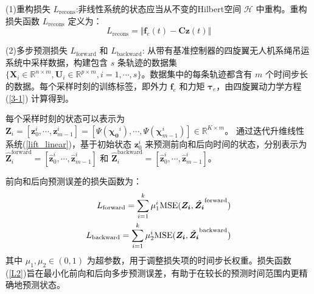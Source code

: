 \documentclass[lang=chs, degree=master, blindreview=true, winfonts=true]{yanputhesis}
\begin{document}
(1)重构损失 $L_{\text{recons}}$:非线性系统的状态应当从不变的Hilbert空间 $\mathcal{H}$ 中重构。重构损失函数 $L_{\text{recons}}$ 定义为：
\begin{equation}
	L_{\text{recons}}=\Vert \bm{f}_e(t) - \bm{C} \bm{z}(t) \Vert
\end{equation}

(2)多步预测损失 $L_{\text{forward}}$ 和 $L_{\text{backward}}$: 从带有基准控制器的四旋翼无人机系绳吊运系统中采样数据，构建包含 $s$ 条轨迹的数据集 $\{\bm{X}_i \in \mathbb{R}^{n\times m}, \bm{U}_i \in \mathbb{R}^{p \times m}, i=1,\cdots,s\}$。数据集中的每条轨迹都含有 $m$ 个时间步长的数据。每个采样时刻的训练标签，即外力 $\bm{f}_e$ 和力矩 $\bm{\tau}_e$，由四旋翼动力学方程 (\ref{3-1}) 计算得到。

每个采样时刻的状态可以表示为 $\bm{Z}_i = [\bm{z}_0^i,\cdots,\bm{z}_{m-1}^i]=[{\Psi}(\bm{\chi_{0}}^i),\cdots,{\Psi}(\bm{\chi}_{m-1}^i)]\in \mathbb{R}^{K\times m}$。
通过迭代升维线性系统(\ref{lift_linear})，基于初始状态 $\bm{z}_0^i$ 来预测前向和后向时间的状态，分别表示为$\hat{\bm{Z}}_i^{\text{forward}} = [\hat{\bm{z}}_0^i, \cdots, \hat{\bm{z}}_{m-1}^i]$ 和 $\hat{\bm{Z}}_i^{\text{backward}} = [\hat{\bm{z}}_0^i, \cdots, \hat{\bm{z}}_{m-1}^i]$。


前向和后向预测误差的损失函数为：
\begin{equation}
	\begin{aligned}
		L_{\text{forward}} = \sum_{i=1}^{k} \mu_1^{i} {\rm MSE}(\bm{Z_{i}},\hat{\bm{Z_{i}}}^{\text{forward}})  \\
		L_{\text{backward}} = \sum_{i=1}^{k} \mu_2^{i} {\rm MSE}(\bm{Z_{i}},\hat{\bm{Z_{i}}}^{\text{backward}})\label{L2}
	\end{aligned}
\end{equation}
其中 $\mu_1,\mu_2 \in(0,1)$ 为超参数，用于调整损失项的时间步长权重。损失函数(\ref{L2})旨在最小化前向和后向多步预测误差，有助于在较长的预测时间范围内更精确地预测状态。
\end{document}
